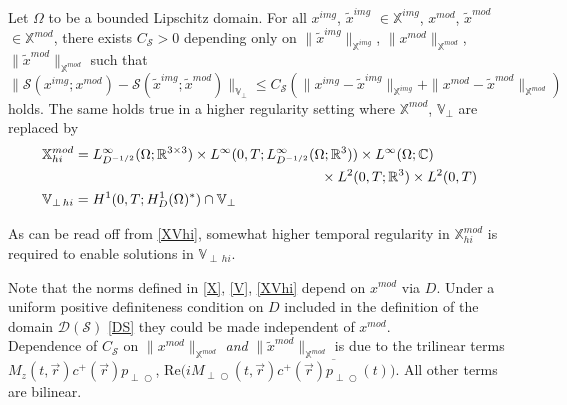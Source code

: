 \documentclass{ws-m3as}
\renewcommand\Re{\mathrm{Re}}
\def\Mpp{M_{\perp\!\!\!\!\!\bigcirc}}
\def\pp{p_{\perp\!\!\!\!\!\bigcirc}}
\newcommand{\revisionown}[1]{{ #1}}
\begin{document}
\begin{proposition}\label{prop:perturb_gen}
Let $\Omega$ to be a bounded Lipschitz domain.
For all ${x}^{img}$, $\tilde{x}^{img}$ $\in\mathbb{X}^{img}$, ${x}^{mod}$, $\tilde{x}^{mod}$ $\in\mathbb{X}^{mod}$, there exists $C_{\mathcal{S}}>0$ depending only on $\|\tilde{x}^{img}\|_{\mathbb{X}^{img}}$, $\|{x}^{mod}\|_{\mathbb{X}^{mod}}$, $\|\tilde{x}^{mod}\|_{\mathbb{X}^{mod}}$ such that 
\[
\|\mathcal{S}(x^{img};x^{mod})-\mathcal{S}(\tilde{x}^{img};\tilde{x}^{mod})\|_{\mathbb{V}_\perp}
\leq C_{\mathcal{S}}(\|x^{img}-\tilde{x}^{img}\|_{\mathbb{X}^{img}}+\|x^{mod}-\tilde{x}^{mod}\|_{\mathbb{X}^{mod}})
\]
holds.
The same holds true in a higher regularity setting where $\mathbb{X}^{mod}$, $\mathbb{V}_\perp$ are replaced by 
\begin{equation}\label{XVhi}
\begin{aligned}
&\mathbb{X}^{mod}_{hi}=L^\infty_{D^{-1/2}}(\Omega;\mathbb{R}^{3\times 3})\times L^\infty(0,T;L^\infty_{D^{-1/2}}(\Omega;\mathbb{R}^3))\times L^\infty(\Omega;\mathbb{C})\\
&\hspace*{7cm}\times L^2(0,T;\mathbb{R}^3)\times L^2(0,T)\\
&\mathbb{V}_{\perp\,hi}=H^1(0,T;H_D^1(\Omega)^*)\cap \mathbb{V}_\perp
\end{aligned}
\end{equation}
\end{proposition}
As can be read off from \eqref{XVhi}, somewhat higher temporal regularity in $\mathbb{X}^{mod}_{hi}$ is required to enable solutions in $\mathbb{V}_{\perp\,hi}$.


Note that 
\revisionown{the norms defined in \eqref{X}, \eqref{V}, \eqref{XVhi}}
depend on $x^{mod}$ via $D$. Under a uniform positive definiteness condition on $D$ included in the definition of the domain $\mathcal{D}(\mathcal{S})$ \revisionown{\eqref{DS}} they could be made independent of $x^{mod}$.\\
Dependence of $C_{\mathcal{S}}$ on $\|{x}^{mod}\|_{\mathbb{X}^{mod}}$ \textit{and} $\|\tilde{x}^{mod}\|_{\mathbb{X}^{mod}}$ is due to the trilinear terms $M_z(t, \vec r)c^+(\vec r)\pp$, $\Re\bigl(i\Mpp(t, \vec r)\overline{c^+(\vec r)\pp(t)}\bigr)$. All other terms are bilinear.
\end{document}
